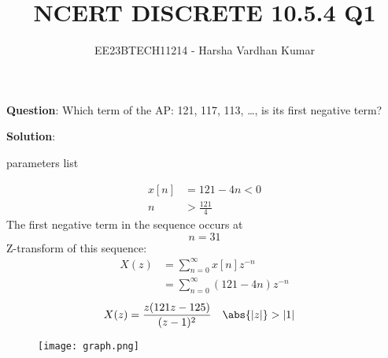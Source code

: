 \documentclass[journal,12pt,twocolumn]{IEEEtran}
\title{NCERT DISCRETE 10.5.4 Q1}
\author{EE23BTECH11214 - Harsha Vardhan Kumar}
\begin{document}
\maketitle

\noindent \textbf{Question}:
Which term of the AP: 121, 117, 113, \ldots, is its first negative term?

\textbf{Solution}:
\begin{table}[htbp]
\centering

\caption{parameters list}
\end{table}

\begin{align}
x[n] &= 121 - 4n < 0 \\
n &> \frac{121}{4} 
\end{align}
The first negative term in the sequence occurs at 
\[ n = 31 \]
Z-transform of this sequence:
\begin{align}
X(z) &= \sum_{n=0}^{\infty} x[n]z^{-n} \\
&= \sum_{n=0}^{\infty} (121 - 4n)z^{-n}
\end{align}
\begin{align}
    X(z) &= \frac{z(121z - 125)}{(z - 1)^2} \quad \abs{|z|} > {|1|}
\end{align}
\pagebreak
\begin{figure}[!ht] 
\centering
\texttt{[image: graph.png]}
\label{fig:Graph1}
\end{figure}
\end{document}
